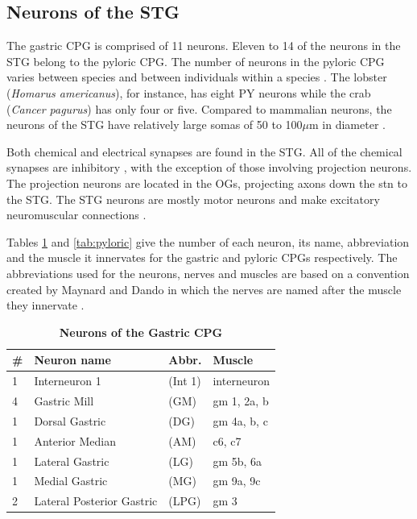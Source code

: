 \subsection{Neurons of the STG}
The gastric \ac{CPG} is comprised of 11 neurons. Eleven to 14 of the neurons in the \ac{STG} belong to the pyloric \ac{CPG}. The number of neurons in the pyloric \ac{CPG} varies between species and between individuals within a species \cite{Daur2012a}. The lobster (\textit{Homarus americanus}), for instance, has eight PY neurons while the crab (\textit{Cancer pagurus}) has only four or five. Compared to mammalian neurons, the neurons of the \ac{STG} have relatively large somas of 50 to 100$\mu$m in diameter \cite{Marder2007}.

Both chemical and electrical synapses are found in the \ac{STG}. All of the chemical synapses are inhibitory \cite{Selverston1987}, with the exception of those involving projection neurons. The projection neurons are located in the \acp{OG}, projecting axons down the \ac{stn} to the \ac{STG}. The \ac{STG} neurons are mostly motor neurons and make excitatory neuromuscular connections \cite{Marder1987}.

Tables \ref{tab:gastric} and \ref{tab:pyloric} give the number of each neuron, its name, abbreviation and the muscle it innervates for the gastric and pyloric \acp{CPG} respectively. The abbreviations used for the neurons, nerves and muscles are based on a convention created by Maynard and Dando in which the nerves are named after the muscle they innervate \cite{Maynard1973, Marder1979a}.

\renewcommand{\tablename}{Table}
\begin{table}
	\centering
	\caption[Neurons of the Gastric \ac{CPG}]{\textbf{Neurons of the Gastric \ac{CPG}}}
	\label{tab:gastric}
	\begin{tabular}{l l l l }
		\hline
		\bf \# & \bf Neuron name & \bf Abbr. & \bf Muscle\\ \hline
		1 & Interneuron 1 & (Int 1) & interneuron \\ 
		4 & Gastric Mill & (GM) & gm 1, 2a, b \\ 
		1 & Dorsal Gastric & (DG) & gm 4a, b, c \\ 
		1 & Anterior Median & (AM) & c6, c7 \\ 
		1 & Lateral Gastric & (LG) & gm 5b, 6a \\ 
		1 & Medial Gastric & (MG) & gm 9a, 9c \\ 
		2 & Lateral Posterior Gastric & (LPG) & gm 3 \\ 
		\hline
	\end{tabular}
\end{table}

